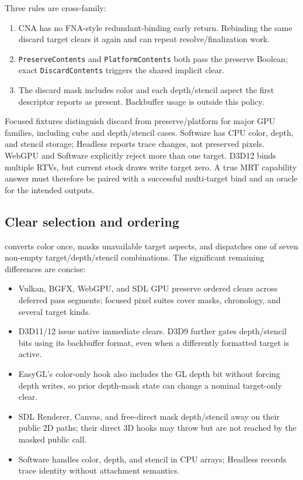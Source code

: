 Three rules are cross-family:

\begin{enumerate}
  \item CNA has no FNA-style redundant-binding early return. Rebinding the same discard target
        clears it again and can repeat resolve/finalization work.
  \item \texttt{PreserveContents} and \texttt{PlatformContents} both pass the preserve Boolean;
        exact \texttt{DiscardContents} triggers the shared implicit clear.
  \item The discard mask includes color and each depth/stencil aspect the first descriptor
        reports as present. Backbuffer usage is outside this policy.
\end{enumerate}

Focused fixtures distinguish discard from preserve/platform for major GPU families, including
cube and depth/stencil cases. Software has CPU color, depth, and stencil storage; Headless reports
trace changes, not preserved pixels. WebGPU and Software explicitly reject more than one target.
D3D12 binds multiple RTVs, but current stock draws write target zero. A true MRT capability answer
must therefore be paired with a successful multi-target bind and an oracle for the intended
outputs.

\subsection{Clear selection and ordering}
\label{sec:backend-clear-matrix}

 converts color once, masks unavailable target aspects, and dispatches
one of seven non-empty target/depth/stencil combinations. The significant remaining differences
are concise:

\begin{itemize}
  \item Vulkan, BGFX, WebGPU, and SDL GPU preserve ordered clears across deferred pass segments;
        focused pixel suites cover masks, chronology, and several target kinds.
  \item D3D11/12 issue native immediate clears. D3D9 further gates depth/stencil bits using its
        backbuffer format, even when a differently formatted target is active.
  \item EasyGL's color-only hook also includes the GL depth bit without forcing depth writes, so
        prior depth-mask state can change a nominal target-only clear.
  \item SDL Renderer, Canvas, and free-direct mask depth/stencil away on their public 2D paths;
        their direct 3D hooks may throw but are not reached by the masked public call.
  \item Software handles color, depth, and stencil in CPU arrays; Headless records trace identity
        without attachment semantics.
\end{itemize}

